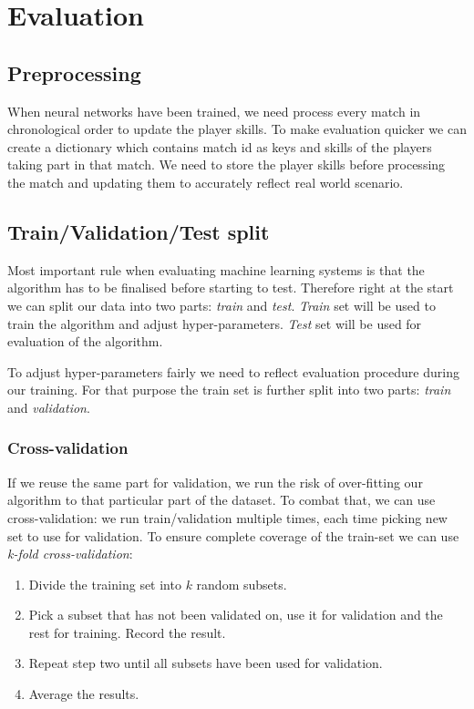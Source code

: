 \documentclass[12pt,a4paper]{book}
\begin{document}
\chapter{Evaluation}
\section{Preprocessing}
When neural networks have been trained, we need process every match in chronological order to update the player skills.
To make evaluation quicker we can create a dictionary which contains match id as keys and skills of the players taking part in that match.
We need to store the player skills before processing the match and updating them to accurately reflect real world scenario.
\section{Train/Validation/Test split}
Most important rule when evaluating machine learning systems is that the algorithm has to be finalised before starting to test.
Therefore right at the start we can split our data into two parts: \emph{train} and \emph{test}.
\emph{Train} set will be used to train the algorithm and adjust hyper-parameters.
\emph{Test} set will be used for evaluation of the algorithm.

To adjust hyper-parameters fairly we need to reflect evaluation procedure during our training.
For that purpose the train set is further split into two parts: \emph{train} and \emph{validation}.
\subsection{Cross-validation}
If we reuse the same part for validation, we run the risk of over-fitting our algorithm to that particular part of the dataset.
To combat that, we can use cross-validation: we run train/validation multiple times, each time picking new set to use for validation.
To ensure complete coverage of the train-set we can use \emph{k-fold cross-validation}: 
\begin{enumerate}
\item Divide the training set into $k$ random subsets.
\item Pick a subset that has not been validated on, use it for validation and the rest for training.
Record the result.
\item Repeat step two until all subsets have been used for validation.
\item Average the results.
\end{enumerate}
\end{document}
